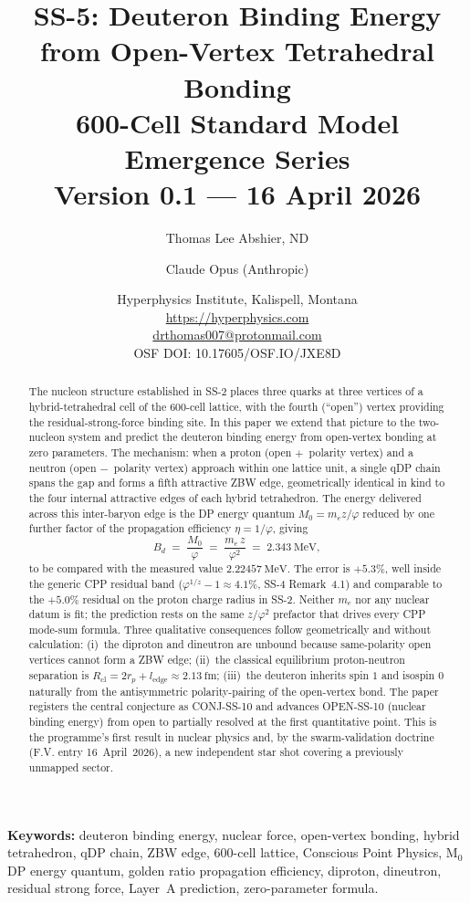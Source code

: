 \documentclass[11pt,letterpaper]{article}
\title{\textbf{SS-5: Deuteron Binding Energy from Open-Vertex Tetrahedral Bonding}\\[6pt]
{\large 600-Cell Standard Model Emergence Series}\\[4pt]
{\normalsize Version 0.1 --- 16 April 2026}}
\author{Thomas Lee Abshier, ND \and Claude Opus (Anthropic)}
\date{\normalsize Hyperphysics Institute, Kalispell, Montana\\
\url{https://hyperphysics.com}\\
\href{mailto:drthomas007@protonmail.com}{drthomas007@protonmail.com}\\[4pt]
\small OSF DOI: 10.17605/OSF.IO/JXE8D}
\newcommand{\phig}{\varphi}
\newcommand{\Mzero}{M_0}
\newcommand{\ledge}{l_{\mathrm{edge}}}
\newcommand{\Bd}{B_{d}}
\newcommand{\rp}{r_{p}}
\begin{document}
\maketitle

\begin{abstract}
The nucleon structure established in SS-2 places three quarks at three vertices of a hybrid-tetrahedral cell of the 600-cell lattice, with the fourth (``open'') vertex providing the residual-strong-force binding site. In this paper we extend that picture to the two-nucleon system and predict the deuteron binding energy from open-vertex bonding at zero parameters. The mechanism: when a proton (open $+$~polarity vertex) and a neutron (open $-$~polarity vertex) approach within one lattice unit, a single qDP chain spans the gap and forms a fifth attractive ZBW edge, geometrically identical in kind to the four internal attractive edges of each hybrid tetrahedron. The energy delivered across this inter-baryon edge is the DP energy quantum $\Mzero = m_e z/\phig$ reduced by one further factor of the propagation efficiency $\eta = 1/\phig$, giving
\[
\Bd \;=\; \frac{\Mzero}{\phig} \;=\; \frac{m_e\, z}{\phig^{2}} \;=\; 2.343~\mathrm{MeV},
\]
to be compared with the measured value $2.22457~\mathrm{MeV}$. The error is $+5.3\%$, well inside the generic CPP residual band ($\phig^{1/z} - 1 \approx 4.1\%$, SS-4 Remark~4.1) and comparable to the $+5.0\%$ residual on the proton charge radius in SS-2. Neither $m_e$ nor any nuclear datum is fit; the prediction rests on the same $z/\phig^2$ prefactor that drives every CPP mode-sum formula. Three qualitative consequences follow geometrically and without calculation: (i)~the diproton and dineutron are unbound because same-polarity open vertices cannot form a ZBW edge; (ii)~the classical equilibrium proton-neutron separation is $R_{\mathrm{cl}} = 2\rp + \ledge \approx 2.13~\mathrm{fm}$; (iii)~the deuteron inherits spin $1$ and isospin $0$ naturally from the antisymmetric polarity-pairing of the open-vertex bond. The paper registers the central conjecture as CONJ-SS-10 and advances OPEN-SS-10 (nuclear binding energy) from open to partially resolved at the first quantitative point. This is the programme's first result in nuclear physics and, by the swarm-validation doctrine (F.V. entry 16~April~2026), a new independent star shot covering a previously unmapped sector.
\end{abstract}

\medskip\noindent
\textbf{Keywords:} deuteron binding energy, nuclear force, open-vertex bonding, hybrid tetrahedron, qDP chain, ZBW edge, 600-cell lattice, Conscious Point Physics, M$_0$ DP energy quantum, golden ratio propagation efficiency, diproton, dineutron, residual strong force, Layer~A prediction, zero-parameter formula.
\end{document}
